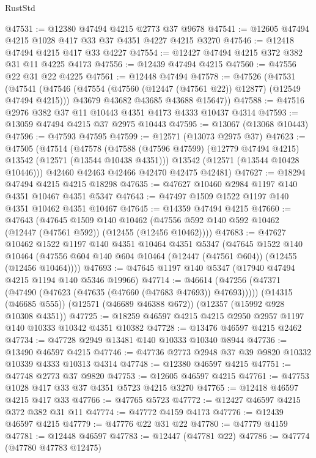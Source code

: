 \begin{lexlean}{RustStd}
\begin{coremodule}
@47531 := @12380 @47494 @4215 @2773 @37 @9678
@47541 := @12605 @47494 @4215 @1028 @417 @33 @37 @4351 @4227 @4215 @3270
@47546 := @12418 @47494 @4215 @417 @33 @4227
@47554 := @12427 @47494 @4215 @372 @382 @31 @11 @4225 @4173
@47556 := @12439 @47494 @4215
@47560 := @47556 @22 @31 @22 @4225
@47561 := @12448 @47494
@47578 := @47526
    (@47531
      (@47541
        (@47546 (@47554 (@47560 (@12447 (@47561 @22)) @12877) (@12549 @47494 @4215)))
        @43679
        @43682
        @43685
        @43688
        @15647))
@47588 := @47516 @2976 @382 @37 @11 @10443 @4351 @4173 @4333 @10437 @4314
@47593 := @13059 @47494 @4215 @37 @2975 @10443
@47595 := @13067 (@13068 @10443)
@47596 := @47593 @47595
@47599 := @12571 (@13073 @2975 @37)
@47623 := @47505
    (@47514
      (@47578
        (@47588 (@47596 @47599) (@12779 @47494 @4215) @13542 (@12571 (@13544 @10438 @4351)))
        @13542
        (@12571 (@13544 @10428 @10446)))
      @42460
      @42463
      @42466
      @42470
      @42475
      @42481)
@47627 := @18294 @47494 @4215 @4215 @18298
@47635 := @47627 @10460 @2984 @1197 @140 @4351 @10467 @4351 @5347
@47643 := @47497 @1509 @1522 @1197 @140 @4351 @10462 @4351 @10467
@47645 := @14359 @47494 @4215
@47660 := @47643
    (@47645
      @1509
      @140
      @10462
      (@47556 @592 @140 @592 @10462 (@12447 (@47561 @592)) (@12455 (@12456 @10462))))
@47683 := @47627
    @10462
    @1522
    @1197
    @140
    @4351
    @10464
    @4351
    @5347
    (@47645
      @1522
      @140
      @10464
      (@47556 @604 @140 @604 @10464 (@12447 (@47561 @604)) (@12455 (@12456 @10464))))
@47693 := @47645 @1197 @140 @5347 (@17940 @47494 @4215 @1194 @140 @5346 @19966)
@47714 := @46614
    (@47256 (@47371 (@47490 (@47623 (@47635 (@47660 (@47683 @47693)) @47693)))))
    (@14315 (@46685 @555))
    (@12571 (@46689 @46388 @672))
    (@12357 (@15992 @928 @10308 @4351))
@47725 := @18259 @46597 @4215 @4215 @2950 @2957 @1197 @140 @10333 @10342 @4351 @10382
@47728 := @13476 @46597 @4215 @2462
@47734 := @47728 @2949 @13481 @140 @10333 @10340 @8944
@47736 := @13490 @46597 @4215
@47746 := @47736 @2773 @2948 @37 @39 @9820 @10332 @10339 @4333 @10313 @4314
@47748 := @12380 @46597 @4215
@47751 := @47748 @2773 @37 @9820
@47753 := @12605 @46597 @4215
@47761 := @47753 @1028 @417 @33 @37 @4351 @5723 @4215 @3270
@47765 := @12418 @46597 @4215 @417 @33
@47766 := @47765 @5723
@47772 := @12427 @46597 @4215 @372 @382 @31 @11
@47774 := @47772 @4159 @4173
@47776 := @12439 @46597 @4215
@47779 := @47776 @22 @31 @22
@47780 := @47779 @4159
@47781 := @12448 @46597
@47783 := @12447 (@47781 @22)
@47786 := @47774 (@47780 @47783 @12475)

\end{coremodule}
\end{lexlean}
